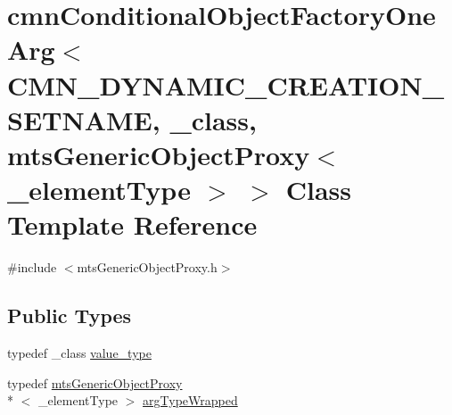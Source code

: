 \hypertarget{classcmn_conditional_object_factory_one_arg_3_01_c_m_n___d_y_n_a_m_i_c___c_r_e_a_t_i_o_n___s_e_tb8b7ba29a3cb16408b71ff50b31fc6ff}{\section{cmn\-Conditional\-Object\-Factory\-One\-Arg$<$ C\-M\-N\-\_\-\-D\-Y\-N\-A\-M\-I\-C\-\_\-\-C\-R\-E\-A\-T\-I\-O\-N\-\_\-\-S\-E\-T\-N\-A\-M\-E, \-\_\-class, mts\-Generic\-Object\-Proxy$<$ \-\_\-element\-Type $>$ $>$ Class Template Reference}
\label{classcmn_conditional_object_factory_one_arg_3_01_c_m_n___d_y_n_a_m_i_c___c_r_e_a_t_i_o_n___s_e_tb8b7ba29a3cb16408b71ff50b31fc6ff}
}


{\ttfamily \#include $<$mts\-Generic\-Object\-Proxy.\-h$>$}

\subsection*{Public Types}
\begin{DoxyCompactItemize}
\item 
typedef \-\_\-class \hyperlink{classcmn_conditional_object_factory_one_arg_3_01_c_m_n___d_y_n_a_m_i_c___c_r_e_a_t_i_o_n___s_e_tb8b7ba29a3cb16408b71ff50b31fc6ff_a5babea558ca848257473a5b237abce37}{value\-\_\-type}
\item 
typedef \hyperlink{classmts_generic_object_proxy}{mts\-Generic\-Object\-Proxy}\\*
$<$ \-\_\-element\-Type $>$ \hyperlink{classcmn_conditional_object_factory_one_arg_3_01_c_m_n___d_y_n_a_m_i_c___c_r_e_a_t_i_o_n___s_e_tb8b7ba29a3cb16408b71ff50b31fc6ff_a07658f61563709ca6484e2313d1cfb8c}{arg\-Type\-Wrapped}
\end{DoxyCompactItemize}
